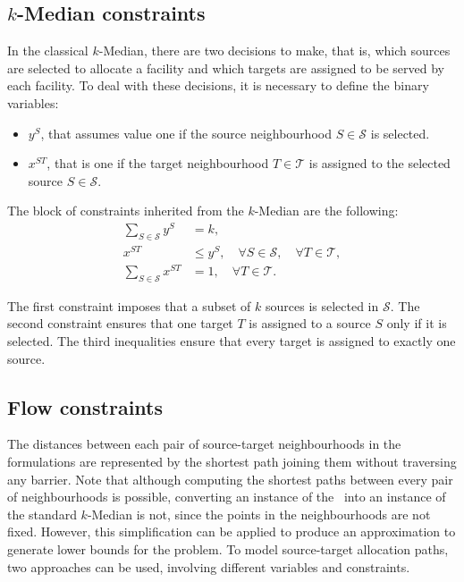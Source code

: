 \documentclass[a4paper,  review, authoryear, 1p.]{elsarticle}
\newcommand{\KMPHN}{{\sf{H-KMPHN}}}
\newcommand{\CV}[1]{{\color{blue}#1}}
\begin{document}
	\CV{
	\subsection{$k$-Median constraints}
	In the classical $k$-Median, there are two decisions to make, that is, which sources are selected to allocate a facility and which targets are assigned to be served by each facility. To deal with these decisions, it is necessary to define the binary variables:
	\begin{itemize}
		\item $y^S$, that assumes value one if the source neighbourhood $S\in\mathcal S$ is selected.
		\item $x^{ST}$, that is one if the target neighbourhood $T\in\mathcal T$ is assigned to the selected source $S\in\mathcal S$.
	\end{itemize}
	
	The block of constraints inherited from the $k$-Median are the following:
	\begin{align}
		\sum_{S\in\mathcal S}y^S&=k,\label{eq:k-median1C}\tag{k-median-C1}\\
		x^{ST}&\leq y^S,\quad\forall S\in\mathcal S,\quad\forall T\in\mathcal T,\label{eq:k-median2C}\tag{k-median-C2}\\
		\sum_{S\in\mathcal S} x^{ST}&=1,\quad\forall T\in\mathcal T\label{eq:k-median3C}\tag{k-median-C3}.
	\end{align}
	
	The first constraint imposes that a subset of $k$ sources is selected in $\mathcal S$. The second constraint ensures that one target $T$ is assigned to a source $S$ only if it is selected. The third inequalities ensure that every target is assigned to exactly one source.
	
	\subsection{Flow constraints}
	The distances between each pair of source-target neighbourhoods in the formulations are represented by the shortest path joining them without traversing any barrier. Note that although computing the shortest paths between every pair of neighbourhoods is possible, converting an instance of the \KMPHN \ into an instance of the standard $k$-Median is not, since the points in the neighbourhoods are not fixed. However, this simplification can be applied to produce an approximation to generate lower bounds for the problem. To model source-target allocation paths, two approaches can be used, involving different variables and constraints. 
	
}
\end{document}
